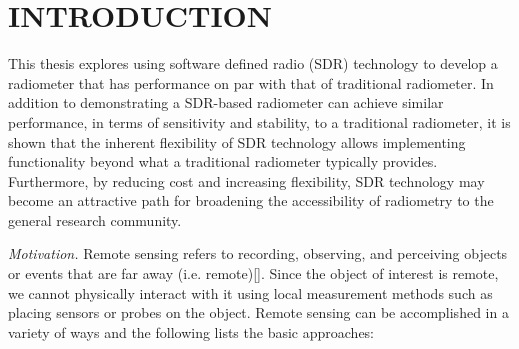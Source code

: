 \chapter{INTRODUCTION}\label{ch:intro}




This thesis explores using software defined radio (SDR) technology to develop a radiometer that has performance on par with that of traditional radiometer.  In addition to demonstrating a SDR-based radiometer can achieve similar performance, in terms of sensitivity and stability, to a traditional radiometer, it is shown that the inherent flexibility of SDR technology allows implementing functionality beyond what a traditional radiometer typically provides.  Furthermore, by reducing cost and increasing flexibility, SDR technology may become an attractive path for broadening the accessibility of radiometry to the general research community.

\emph{Motivation.}  Remote sensing refers to recording, observing, and perceiving objects or events that are far away (i.e. remote)[\cite{weng2012}].  Since the object of interest is remote, we cannot physically interact with it using local measurement methods such as placing sensors or probes on the object.  Remote sensing can be accomplished in a variety of ways and the following lists the basic approaches:


